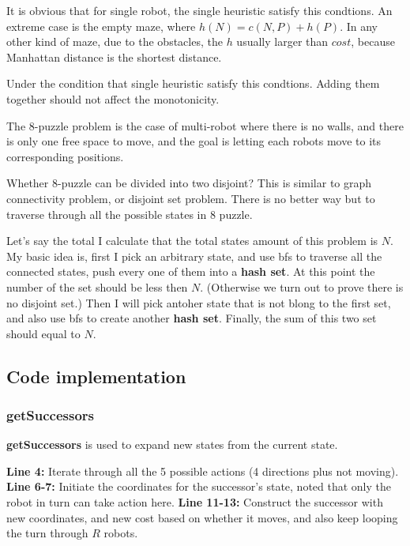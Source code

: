\documentclass{article}
\begin{document}
It is obvious that for single robot, the single heuristic satisfy this condtions. An extreme case is the empty maze, where $h(N) = c(N,P)+h(P) $. In any other kind of maze, due to the obstacles, the $h$ usually larger than $cost$, because Manhattan distance is the shortest distance.

Under the condition that single heuristic satisfy this condtions. Adding them together should not affect the monotonicity.

The 8-puzzle problem is the case of multi-robot where there is no walls, and there is only one free space to move, and the goal is letting each robots move to its corresponding positions.

Whether 8-puzzle can be divided into two disjoint? This is similar to graph connectivity problem, or disjoint set problem. There is no better way but to traverse through all the possible states in 8 puzzle.

Let's say the total I calculate that the total states amount of this problem is $N$. My basic idea is, first I pick an arbitrary state, and use bfs to traverse all the connected states, push every one of them into a \textbf{hash set}. At this point the number of the set should be less then $N$. (Otherwise we turn out to prove there is no disjoint set.) Then I will pick antoher state that is not blong to the first set, and also use bfs to create another \textbf{hash set}. Finally, the sum of this two set should equal to $N$.



















\subsection{Code implementation}


\subsubsection{getSuccessors}

\textbf{getSuccessors} is used to expand new states from the current state.

\textbf{Line 4:} Iterate through all the 5 possible actions (4 directions plus not moving).
\textbf{Line 6-7:} Initiate the coordinates for the successor's state, noted that only the robot in turn can take action here.
\textbf{Line 11-13:} Construct the successor with new coordinates, and new cost based on whether it moves, and also keep looping the turn through $R$ robots.
\end{document}
